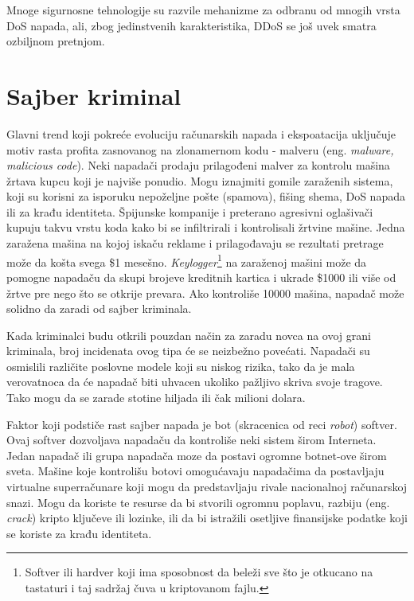 \documentclass[a4paper]{article}
\theoremstyle{break}
\begin{document}
{Mnoge sigurnosne tehnologije su razvile mehanizme za odbranu od mnogih vrsta DoS napada, ali, zbog jedinstvenih karakteristika, DDoS se još uvek smatra ozbiljnom pretnjom.

\section{Sajber kriminal}
\label{sec:sajber_kriminal}


Glavni trend koji pokreće evoluciju računarskih napada i ekspoatacija uključuje motiv rasta profita zasnovanog na zlonamernom kodu - malveru (eng. {\em malware, malicious code}). Neki napadači prodaju prilagođeni malver za kontrolu mašina žrtava kupcu koji je najviše ponudio. Mogu iznajmiti gomile zaraženih sistema, koji su korisni za isporuku nepoželjne pošte (spamova), fišing shema, DoS napada ili za krađu identiteta. Špijunske kompanije i preterano agresivni oglašivači kupuju takvu vrstu koda kako bi se infiltrirali i kontrolisali žrtvine mašine. Jedna zaražena mašina na kojoj iskaču reklame i prilagođavaju se rezultati pretrage može da košta svega \$1 mesešno. {\em Keylogger}\footnote{Softver ili hardver koji ima sposobnost da beleži sve što je otkucano na tastaturi i taj sadržaj čuva u kriptovanom fajlu.} na zaraženoj mašini može da pomogne napadaču da skupi brojeve kreditnih kartica i ukrade \$1000 ili više od žrtve pre nego što se otkrije prevara. Ako kontroliše 10000 mašina, napadač može solidno da zaradi od sajber kriminala. 

Kada kriminalci budu otkrili pouzdan način za zaradu novca na ovoj grani kriminala, broj incidenata ovog tipa će se neizbežno povećati. Napadači su osmislili različite poslovne modele koji su niskog rizika, tako da je mala verovatnoca da će napadač biti uhvacen ukoliko pažljivo skriva svoje tragove. Tako mogu da se zarade stotine hiljada ili čak milioni dolara.

Faktor koji podstiče rast sajber napada je bot (skracenica od reci \textit{robot}) softver. Ovaj softver dozvoljava napadaču da kontroliše neki sistem širom Interneta. Jedan napadač ili grupa napadača moze da postavi ogromne botnet-ove širom sveta. Mašine koje kontrolišu botovi omogućavaju napadačima da postavljaju virtualne superračunare koji mogu da predstavljaju rivale nacionalnoj računarskoj snazi. Mogu da koriste te resurse da bi stvorili ogromnu poplavu, razbiju (eng. {\em crack}) kripto ključeve ili lozinke, ili da bi istražili osetljive finansijske podatke koji se koriste za krađu identiteta.

}
\end{document}
